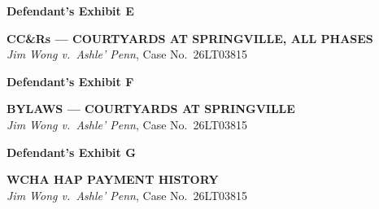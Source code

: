 \documentclass[10pt,letterpaper,oneside]{extarticle}
\begin{document}
\vspace{0.5em}

\newpage
{}
\begin{flushleft}
	\textbf{\large Defendant's Exhibit E}
\end{flushleft}
\begin{center}
	\textbf{CC\&Rs --- COURTYARDS AT SPRINGVILLE,
		ALL PHASES}\\[4pt]
	\textit{Jim Wong v.\ Ashle' Penn},
	Case No.\ 26LT03815
\end{center}
\vspace{0.5em}

\newpage
{}
\begin{flushleft}
	\textbf{\large Defendant's Exhibit F}
\end{flushleft}
\begin{center}
	\textbf{BYLAWS --- COURTYARDS AT SPRINGVILLE}\\[4pt]
	\textit{Jim Wong v.\ Ashle' Penn},
	Case No.\ 26LT03815
\end{center}
\vspace{0.5em}

\newpage
{}
\begin{flushleft}
	\textbf{\large Defendant's Exhibit G}
\end{flushleft}
\begin{center}
	\textbf{WCHA HAP PAYMENT HISTORY}\\[4pt]
	\textit{Jim Wong v.\ Ashle' Penn},
	Case No.\ 26LT03815
\end{center}
\vspace{0.5em}

\end{document}
